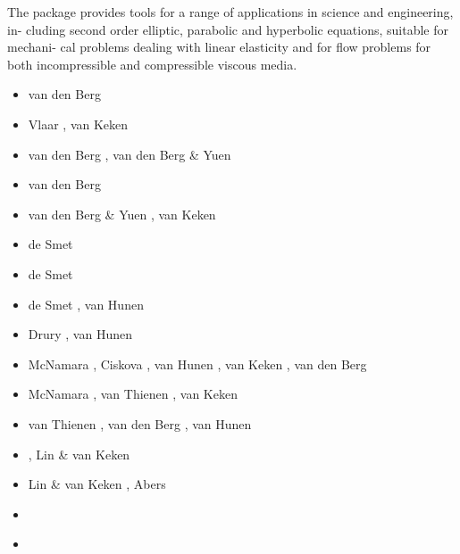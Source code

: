 \begin{itemize}
The package provides tools for a range of applications in science and engineering, in-
cluding second order elliptic, parabolic and hyperbolic equations, suitable for mechani-
cal problems dealing with linear elasticity and for flow problems for both incompressible
and compressible viscous media.

\begin{scriptsize}
\begin{itemize}
\item[\nineteenninetythree] van den Berg \etal \cite{beky93,vavy93}
\item[\nineteenninetyfour] Vlaar \etal \cite{vlvv94}, van Keken \etal \cite{vayv94}
\item[\nineteenninetyfive] van den Berg \etal \cite{vayv95}, van den Berg \& Yuen \cite{vayu95}
\item[\nineteenninetysix] van den Berg \etal \cite{vayu96}
\item[\nineteenninetyseven] van den Berg \& Yuen \cite{vayu97}, van Keken \cite{vank97}
\item[\nineteenninetyeight] de Smet \etal \cite{devv98}
\item[\nineteenninetynine] de Smet \etal \cite{devv99}
\item[\twothousand] de Smet \etal \cite{devv00b}, van Hunen \etal \cite{vavv00}
\item[\twothousandone] Drury \etal \cite{drvc01}, van Hunen \etal \cite{vavv01}
\item[\twothousandtwo] McNamara \etal \cite{mcvk02}, Ciskova \etal \cite{civv02},
                       van Hunen \etal \cite{vavv02,vavv02b}, van Keken \etal \cite{vakp02},
                       van den Berg \etal \cite{vaya02}
\item[\twothousandthree] McNamara \etal \cite{mcvk03}, van Thienen \etal \cite{vavd03},
                         van Keken \etal \cite{vabh03}
\item[\twothousandfour] van Thienen \etal \cite{vavv04,vavv04b,vavv04c}, van den Berg \etal \cite{vayr04},
                        van Hunen \etal \cite{vavv04d}
\item[\twothousandfive] \cite{vavv05}\cite{sepr05}\cite{vary05}, Lin \& van Keken \cite{liva05}
\item[\twothousandsix] Lin \& van Keken \cite{liva06a,liva06b}, Abers \etal \cite{abvk06}
\item[\twothousandseven] \cite{vant07}\cite{civv07}\cite{brva07a}\cite{brva07b}\cite{knvk07}
\item[\twothousandeight] \cite{plva08}\cite{brhv08}\cite{knva08}\cite{vava08}

\end{itemize}
\end{scriptsize}
\end{itemize}
